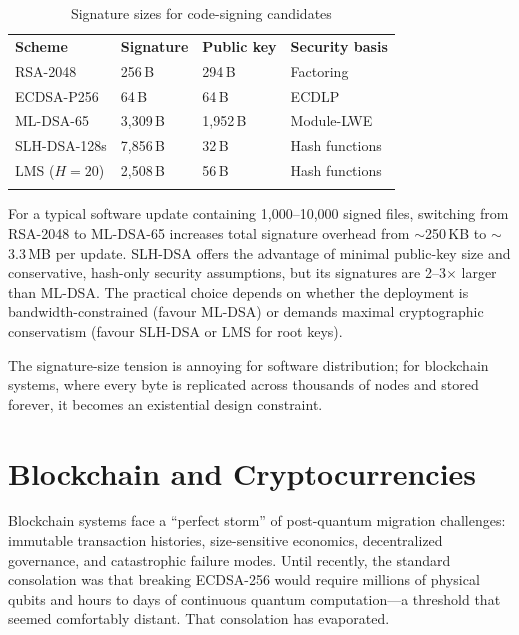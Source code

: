 \begin{table}[t]
\caption{Signature sizes for code-signing candidates}
\label{tab:codesign-sizes}
\begin{tabular}{p{3.5cm}p{2.5cm}p{2.5cm}p{3cm}}
\hline\noalign{\smallskip}
\textbf{Scheme} & \textbf{Signature} & \textbf{Public key} & \textbf{Security basis} \\
\noalign{\smallskip}\svhline\noalign{\smallskip}
RSA-2048 & 256\,B & 294\,B & Factoring \\
ECDSA-P256 & 64\,B & 64\,B & ECDLP \\
ML-DSA-65 & 3{,}309\,B & 1{,}952\,B & Module-LWE \\
SLH-DSA-128s & 7{,}856\,B & 32\,B & Hash functions \\
LMS ($H{=}20$) & 2{,}508\,B & 56\,B & Hash functions \\
\noalign{\smallskip}\hline
\end{tabular}
\end{table}

For a typical software update containing 1{,}000--10{,}000 signed files, switching from RSA-2048 to ML-DSA-65 increases total signature overhead from $\sim$250\,KB to $\sim$3.3\,MB per update.  SLH-DSA offers the advantage of minimal public-key size and conservative, hash-only security assumptions, but its signatures are 2--3$\times$ larger than ML-DSA.  The practical choice depends on whether the deployment is bandwidth-constrained (favour ML-DSA) or demands maximal cryptographic conservatism (favour SLH-DSA or LMS for root keys).

The signature-size tension is annoying for software distribution; for blockchain systems, where every byte is replicated across thousands of nodes and stored forever, it becomes an existential design constraint.

\section{Blockchain and Cryptocurrencies}
\label{sec:blockchain}

Blockchain systems face a ``perfect storm'' of post-quantum migration challenges: immutable transaction histories, size-sensitive economics, decentralized governance, and catastrophic failure modes.  Until recently, the standard consolation was that breaking ECDSA-256 would require millions of physical qubits and hours to days of continuous quantum computation---a threshold that seemed comfortably distant.  That consolation has evaporated.

